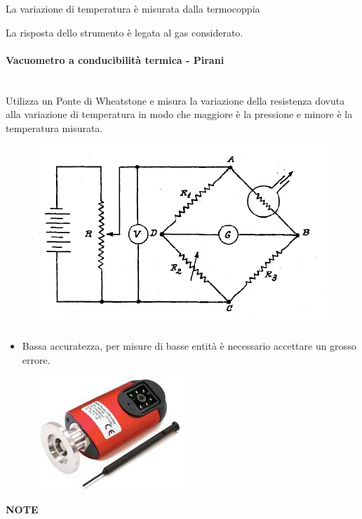 \documentclass[a4paper, 15pt]{article}
\newcommand{\xmark}{\ding{55}}
\begin{document}
\begin{adjustwidth}{2in}{}
		La variazione di temperatura è misurata dalla termocoppia
		
		La risposta dello strumento è legata al gas considerato. 
		
\paragraph{Vacuometro a conducibilità termica - Pirani} \mbox{} \\
 		Utilizza un Ponte di Wheatstone e misura la variazione della resistenza dovuta alla variazione di temperatura in modo che maggiore è la pressione e minore è la temperatura misurata.
\begin{figure}[H]
	\centering
	\label{fig:manometro16}
	\includegraphics[width=0.3\linewidth]{immagini/manometro16}
\end{figure} 		
	 	\begin{itemize}[label=\textcolor{red}{\xmark}]
	 		\item Bassa accuratezza, per misure di basse entità è necessario accettare un grosso errore.
	 	\end{itemize}
	 	\begin{figure}[H]
	 		\centering
	 		\includegraphics[width=0.2\linewidth]{immagini/p5}
	 		\label{fig:p5}
	 	\end{figure}
\newpage	 	
{\LARGE \textbf{NOTE}}
	
\end{adjustwidth}
\end{document}
